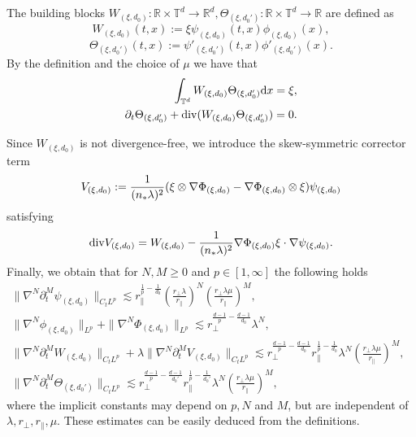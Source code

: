 \documentclass[UTF-8,reqno]{amsart}
\numberwithin{equation}{section}
\theoremstyle{definition}
\def\dif{{\mathord{{\rm d}}}}
\def\geq{\geqslant}
\def\div{\mathord{{\rm div}}}
\def\dif{{\mathord{{\rm d}}}}
\def\geq{\geqslant}
\def\div{\mathord{{\rm div}}}
\begin{document}
The building blocks $W_{(\xi,d_0)} :\mathbb{R} \times\mathbb{T}^d \to \mathbb{R}^d,\Theta_{(\xi,d_0')} :\mathbb{R} \times\mathbb{T}^d \to \mathbb{R}$ are defined as
$$W_{(\xi,d_0)}(t,x):=\xi\psi_{(\xi,d_0)}(t,x)\phi_{(\xi,d_0)}(x),$$
$$\Theta_{(\xi,d_0')}(t,x):=\psi'_{(\xi,d_0')}(t,x)\phi'_{(\xi,d_0')}(x).$$
By the definition and the choice of $\mu$ we have that 
\begin{align}
\int _{\mathbb{T}^d}W_{(\xi,d_0)}\Theta_{(\xi,d_0')}\dif x=\xi,\label{eq:intwthe}\\
\partial_t\Theta_{(\xi,d_0')}+ \div (W_{(\xi,d_0)}\Theta_{(\xi,d_0')})=0.\label{eq:ptthe+}
\end{align}


Since $W_{(\xi,d_0)}$ is not divergence-free, we
introduce the skew-symmetric corrector term
\begin{align}
V_{(\xi,d_0)}:=\frac{1}{(n_*\lambda)^2}(\xi\otimes\nabla\Phi_{(\xi,d_0)}-\nabla\Phi_{(\xi,d_0)}\otimes\xi)\psi_{(\xi,d_0)}\notag
\end{align}
satisfying
\begin{align}
\div V_{(\xi,d_0)}
=W_{(\xi,d_0)} -\frac{1}{(n_*\lambda)^2}\nabla\Phi_{(\xi,d_0)}\xi\cdot\nabla\psi_{(\xi,d_0)}.\label{divOmega}
\end{align}
Finally, we obtain that for $N, M \geq 0$ and $p\in [1, \infty]$ the
following holds
\begin{align}
\|\nabla^N\partial_t^M\psi_{(\xi,d_0)}\|_{C_tL^p }\lesssim r_\parallel^{\frac{1}{p}-\frac{1}{d_0}}(\frac{r_\perp\lambda}{r_\parallel})^N(\frac{r_\perp\lambda\mu}{r_\parallel})^M,
&\label{int2}\\
\|\nabla^N\phi_{(\xi,d_0)}\|_{L^p }+\|\nabla^N\Phi_{(\xi,d_0)}\|_{L^p }\lesssim r_\perp^{\frac{d-1}{p}-\frac{d-1}{d_0}}\lambda^{N},
&\label{int3}\\
\|\nabla^N\partial_t^MW_{(\xi,d_0)}\|_{C_tL^p }+\lambda\|\nabla^N\partial_t^MV_{(\xi,d_0)}\|_{C_tL^p }
\lesssim r_\perp^{\frac{d-1}{p}-\frac{d-1}{d_0}}r_\parallel^{\frac{1}{p}-\frac{1}{d_0}}\lambda^{N}(\frac{r_\perp\lambda\mu}{r_\parallel})^M,&\label{int4}\\ \|\nabla^N\partial_t^M\Theta_{(\xi,d_0')}\|_{C_tL^p }\lesssim r_\perp^{\frac{d-1}{p}-\frac{d-1}{d_0'}}r_\parallel^{\frac{1}{p}-\frac{1}{d_0'}}\lambda^{N}(\frac{r_\perp\lambda\mu}{r_\parallel})^M,& \label{int4theta}
\end{align}
where the implicit constants may depend on $p,N$ and $M$, but are independent of $\lambda,r_\perp,r_\parallel,\mu$. These estimates can be easily deduced from the definitions.
\end{document}
